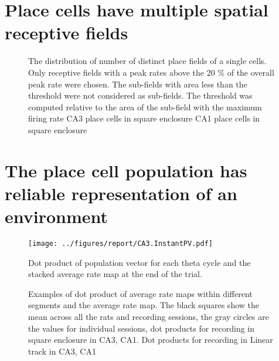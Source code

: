 \section[Multiple Place fields]{Place cells have multiple spatial receptive fields}
\begin{figure}[htb!]
\centering
{}
\label{fig:nsubfields}
\caption[Multiple receptive fields of Place Cells]{The distribution of number of distinct place fields of a single cells. Only receptive fields with a peak rates above the 20 \% of the overall peak rate were chosen. The sub-fields with area less than the threshold were not considered as sub-fields. The threshold was computed relative to the area of the sub-field with the maximum firing rate  CA3 place cells in square enclosure  CA1 place cells in square enclosure}
\end{figure}



\section[Population activity within a fixed environment]{The place cell population has reliable representation of an environment}

\begin{figure}[htb!]
\centering
\texttt{[image: ../figures/report/CA3.InstantPV.pdf]}
\label{fig:sf1}
\caption{Dot product of population vector for each theta cycle and the stacked average rate map at the end of the trial.}
\end{figure}

\begin{figure}[htb!]
\centering
{}
\caption[Population Vector time course]{Examples of dot product of average rate maps within different segments and the average rate map. The black squares show the mean across all the rats and recording sessions, the gray circles are the values for individual sessions, dot products for recording in square enclosure in  CA3,  CA1. Dot products for recording in Linear track in  CA3,  CA1}
\end{figure}

